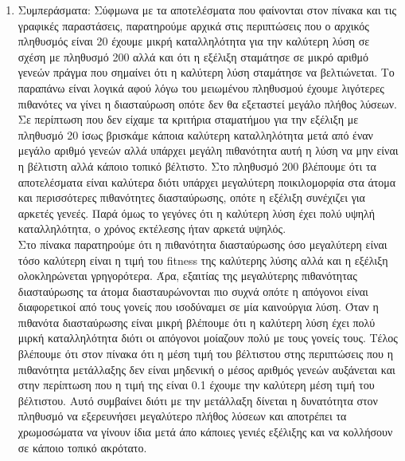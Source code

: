 \documentclass[12pt,a4paper]{article}
\newcommand{\tl}{\textlatin}
\begin{document}
\begin{enumerate}
\begin{figure}[H]
\begin{subfigure}[ht]{0.7\textwidth}
                         \caption*{Περίπτωση: 200, 0.1 ,0.01}
                     \end{subfigure}
                \end{figure} 
            \item Συμπεράσματα: 
                    Σύφμωνα με τα αποτελέσματα που 
                    φαίνονται στον πίνακα και τις γραφικές παραστάσεις, παρατηρούμε αρχικά
                    στις περιπτώσεις που ο αρχικός πληθυσμός
                    είναι 20 έχουμε  μικρή καταλληλότητα για την καλύτερη λύση
                    σε σχέση με πληθυσμό 200 αλλά και
                    ότι η εξέλιξη σταμάτησε σε μικρό αριθμό
                    γενεών πράγμα που σημαίνει ότι η καλύτερη λύση σταμάτησε να βελτιώνεται.
                    Το παραπάνω είναι λογικά αφού λόγω του μειωμένου
                    πληθυσμού έχουμε λιγότερες πιθανότες να γίνει η διασταύρωση
                    οπότε δεν θα εξεταστεί μεγάλο πλήθος λύσεων. Σε περίπτωση 
                    που δεν είχαμε τα κριτήρια σταματήμου για
                    την εξέλιξη με πληθυσμό 20 ίσως βρισκάμε κάποια καλύτερη καταλληλότητα
                    μετά από έναν μεγάλο αριθμό γενεών αλλά υπάρχει μεγάλη
                    πιθανότητα αυτή η λύση να μην είναι η βέλτιστη αλλά κάποιο
                    τοπικό βέλτιστο. Στο
                    πληθυσμό 200 βλέπουμε ότι τα αποτελέσματα είναι καλύτερα διότι υπάρχει 
                    μεγαλύτερη ποικιλομορφία στα άτομα και περισσότερες
                    πιθανότητες διασταύρωσης, οπότε η
                    εξέλιξη συνέχιζει για αρκετές γενεές. Παρά όμως το γεγόνες
                    ότι η καλύτερη λύση έχει πολύ υψηλή καταλληλότητα, ο χρόνος
                    εκτέλεσης ήταν αρκετά υψηλός.\\
                    Στο πίνακα παρατηρούμε ότι η πιθανότητα
                    διασταύρωσης όσο μεγαλύτερη είναι τόσο καλύτερη είναι η τιμή του
                    \tl{fitness} της καλύτερης λύσης αλλά και
                    η εξέλιξη ολοκληρώνεται γρηγορότερα. Άρα, εξαιτίας της μεγαλύτερης
                    πιθανότητας διασταύρωσης τα άτομα 
                    διασταυρώνονται πιο συχνά οπότε η απόγονοι είναι
                    διαφορετικοί από τους γονείς που ισοδύναμει σε μία
                    καινούργια
                    λύση. Όταν η πιθανότα διασταύρωσης είναι μικρή βλέπουμε ότι
                    η καλύτερη λύση έχει πολύ μιρκή καταλληλότητα διότι οι
                    απόγονοι μοίαζουν πολύ με τους γονείς τους. Τέλος βλέπουμε ότι στον πίνακα ότι
                    η μέση τιμή του βέλτιστου στης περιπτώσεις που η πιθανότητα
                    μετάλλαξης δεν είναι μηδενική ο μέσος αριθμός
                    γενεών αυξάνεται και στην περίπτωση που η τιμή της είναι 0.1
                    έχουμε την καλύτερη μέση τιμή του βέλτιστου.
                    Αυτό συμβαίνει διότι με την μετάλλαξη δίνεται η δυνατότητα στον
                    πληθυσμό να εξερευνήσει μεγαλύτερο πλήθος
                    λύσεων και αποτρέπει τα χρωμοσώματα να γίνουν ίδια μετά άπο κάποιες
                    γενιές εξέλιξης και να κολλήσουν σε κάποιο τοπικό ακρότατο.
        \end{enumerate}
\end{document}
